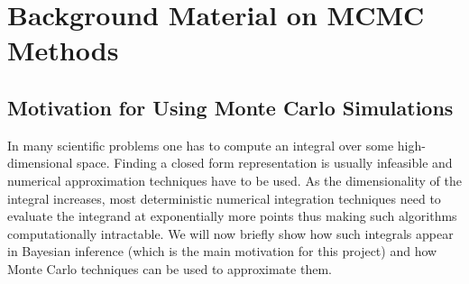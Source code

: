 \documentclass[report.tex]{subfiles}
\begin{document}
\chapter{Background Material on MCMC Methods}
\label{appendix-mcmc-background}

\section{Motivation for Using Monte Carlo Simulations}
\label{mcmc-motivation}

In many scientific problems one has to compute an integral over some
high-dimensional space.
Finding a closed form representation is usually infeasible and numerical
approximation techniques have to be used.
As the dimensionality of the integral increases, most deterministic
numerical integration techniques need to evaluate the integrand at exponentially
more points thus making such algorithms computationally intractable.
We will now briefly show how such integrals appear in Bayesian inference
(which is the main motivation for this project)
and how Monte Carlo techniques can be used to approximate
them.
\end{document}
